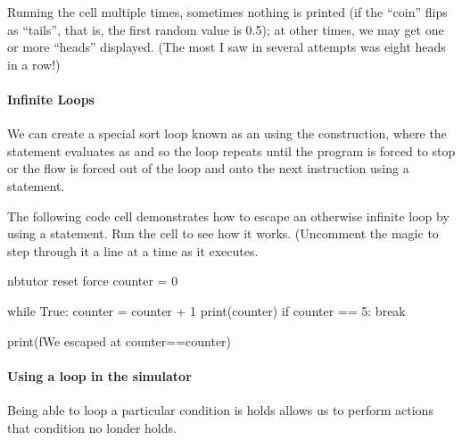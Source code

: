 \documentclass[letterpaper,10pt,english]{sphinxmanual}
\begin{document}
{Running the cell multiple times, sometimes nothing is printed (if the “coin” flips as “tails”, that is, the first random value is  0.5); at other times, we may get one or more “heads” displayed. (The most I saw in several attempts was eight heads in a row!)


\paragraph{Infinite Loops}
\label{\detokenize{content/02_Robot_Lab/Section_00_01:Infinite-Loops}}
We can create a special sort loop known as an  using the  construction, where the statement   evaluates as  and so the loop repeats until the program is forced to stop or the flow is forced out of the loop and onto the next instruction using a  statement.

The following code cell demonstrates how to escape an otherwise infinite loop by using a  statement. Run the cell to see how it works. (Uncomment the  magic to step through it a line at a time as it executes.

{
\begin{sphinxVerbatim}[commandchars=\\\{\}]
\llap{\color{nbsphinxin}[ ]:\,\hspace{\fboxrule}\hspace{\fboxsep}}\PYGZsh{}\PYGZpc{}\PYGZpc{}nbtutor \PYGZhy{}\PYGZhy{}reset \PYGZhy{}\PYGZhy{}force
counter = 0

while True:
    counter = counter + 1
    print(counter)
    if counter == 5:
        break

print(f\PYGZdq{}We escaped at counter==\PYGZob{}counter\PYGZcb{}\PYGZdq{})
\end{sphinxVerbatim}
}


\paragraph{Using a  loop in the simulator}
\label{\detokenize{content/02_Robot_Lab/Section_00_01:Using-a-while-loop-in-the-simulator}}
Being able to loop  a particular condition is holds allows us to perform actions  that condition no londer holds.

}
\end{document}
